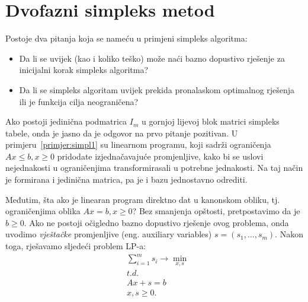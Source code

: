 \documentclass[a4paper, utf8, 11pt, colorlinks]{book}
\theoremstyle{definition}
\begin{document}
 \section{Dvofazni simpleks metod}
 Postoje dva pitanja koja se nameću u primjeni simpleks algoritma:
 \begin{itemize}
     \item Da li se uvijek (kao i koliko teško)   može naći bazno dopustivo rješenje za inicijalni korak 
     simpleks algoritma?
     \item Da li se simpleks algoritam uvijek prekida pronalaskom optimalnog rješenja ili je funkcija cilja neograničena?
 \end{itemize}
Ako postoji jedinična podmatrica $I_m$ u gornjoj lijevoj blok matrici simpleks tabele, onda je jasno da je odgovor na prvo pitanje pozitivan. U primjeru~\ref{primjer:simpl1} su linearnom programu, koji sadrži ograničenja $Ax \leq b, x\geq 0$ pridodate izjednačavajuće promjenljive, kako bi se uslovi nejednakosti u ograničenjima transformirasali u potrebne jednakosti.  Na taj način je formirana i jedinična matrica, pa je i bazu jednostavno odrediti.
 
 
 Međutim, šta ako je linearan program direktno dat u kanonskom obliku, tj. ograničenjima oblika $Ax = b, x \geq 0$? Bez smanjenja opštosti, pretpostavimo da je $b \geq 0$. Ako ne postoji očigledno bazno dopustivo rješenje ovog problema, onda uvodimo \emph{vještačke} promjenljive (eng. auxiliary variables) $s = (s_1,\ldots, s_m)$. Nakon toga, rješavamo sljedeći problem LP-a:
 \begin{align}
      &\sum_{i=1}^m s_i \rightarrow \min_{x,s} \nonumber \\
      & {t.d.}\label{eq:artificial_lp_simplex}\\
      & A x + s = b \nonumber \\
      &  x, s \geq 0. \nonumber
 \end{align}
  
\end{document}
